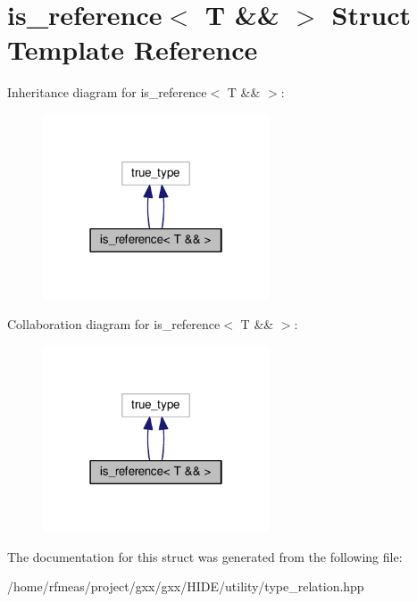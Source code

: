 \hypertarget{structis__reference_3_01T_01_6_6_01_4}{}\section{is\+\_\+reference$<$ T \&\& $>$ Struct Template Reference}
\label{structis__reference_3_01T_01_6_6_01_4}


Inheritance diagram for is\+\_\+reference$<$ T \&\& $>$\+:
\nopagebreak
\begin{figure}[H]
\begin{center}
\leavevmode
\includegraphics[width=190pt]{structis__reference_3_01T_01_6_6_01_4__inherit__graph}
\end{center}
\end{figure}


Collaboration diagram for is\+\_\+reference$<$ T \&\& $>$\+:
\nopagebreak
\begin{figure}[H]
\begin{center}
\leavevmode
\includegraphics[width=190pt]{structis__reference_3_01T_01_6_6_01_4__coll__graph}
\end{center}
\end{figure}


The documentation for this struct was generated from the following file\+:\begin{DoxyCompactItemize}
\item 
/home/rfmeas/project/gxx/gxx/\+H\+I\+D\+E/utility/type\+\_\+relation.\+hpp\end{DoxyCompactItemize}
